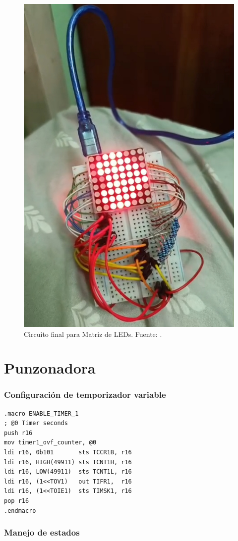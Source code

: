 \begin{figure}[H]
  \centering
  \includegraphics[width=0.7\linewidth]{./Anexos/Resultados/Matriz/Circuito.jpg}
  \caption{Circuito final para Matriz de LEDs. Fuente: \cite{LabDrive}.}
  \label{fig:circuito_matriz}
\end{figure}


\section{Punzonadora}

\subsubsection{Configuración de temporizador variable}
\begin{verbatim}
.macro ENABLE_TIMER_1
; @0 Timer seconds
push r16
mov timer1_ovf_counter, @0
ldi r16, 0b101		 sts TCCR1B, r16
ldi r16, HIGH(49911) sts TCNT1H, r16
ldi r16, LOW(49911)	 sts TCNT1L, r16 
ldi r16, (1<<TOV1)   out TIFR1,  r16 
ldi r16, (1<<TOIE1)  sts TIMSK1, r16 
pop r16
.endmacro
\end{verbatim}


\subsubsection{Manejo de estados}

